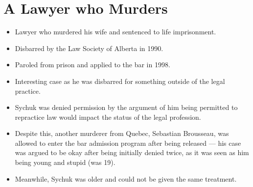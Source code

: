 \documentclass{article}
\begin{document}
\section{A Lawyer who Murders}
\begin{itemize}
    \item Lawyer who murdered his wife and sentenced to life imprisonment.
    \item Disbarred by the Law Society of Alberta in 1990.
    \item Paroled from prison and applied to the bar in 1998.
    \item Interesting case as he was disbarred for something outside of the legal practice.
    \item Sychuk was denied permission by the argument of him being permitted to repractice law would impact the status of the legal profession.
    \item Despite this, another murderer from Quebec, Sebastian Brousseau, was allowed to enter the bar admission program after being released --- his case was argued to be okay after being initially denied twice, as it was seen as him being young and stupid (was 19).
    \item Meanwhile, Sychuk was older and could not be given the same treatment.
\end{itemize}
\end{document}

